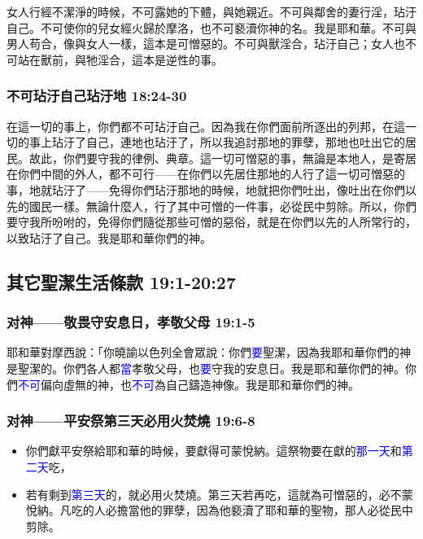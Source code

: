 女人行經不潔淨的時候，不可露她的下體，與她親近。不可與鄰舍的妻行淫，玷汙自己。不可使你的兒女經火歸於摩洛，也不可褻瀆你神的名。我是耶和華。不可與男人苟合，像與女人一樣，這本是可憎惡的。不可與獸淫合，玷汙自己；女人也不可站在獸前，與牠淫合，這本是逆性的事。

\subsubsection{不可玷汙自己玷汙地 18:24-30}
在這一切的事上，你們都不可玷汙自己。因為我在你們面前所逐出的列邦，在這一切的事上玷汙了自己，連地也玷汙了，所以我追討那地的罪孽，那地也吐出它的居民。故此，你們要守我的律例、典章。這一切可憎惡的事，無論是本地人，是寄居在你們中間的外人，都不可行——在你們以先居住那地的人行了這一切可憎惡的事，地就玷汙了——免得你們玷汙那地的時候，地就把你們吐出，像吐出在你們以先的國民一樣。無論什麼人，行了其中可憎的一件事，必從民中剪除。所以，你們要守我所吩咐的，免得你們隨從那些可憎的惡俗，就是在你們以先的人所常行的，以致玷汙了自己。我是耶和華你們的神。

\subsection{其它聖潔生活條款 19:1-20:27}
\subsubsection{对神——敬畏守安息日，孝敬父母 19:1-5}
耶和華對摩西說：「你曉諭以色列全會眾說：你們\textcolor{blue}{要}聖潔，因為我耶和華你們的神是聖潔的。你們各人都\textcolor{blue}{當}孝敬父母，也\textcolor{blue}{要}守我的安息日。我是耶和華你們的神。你們\textcolor{blue}{不可}偏向虛無的神，也\textcolor{blue}{不可}為自己鑄造神像。我是耶和華你們的神。

\subsubsection{对神——平安祭第三天必用火焚燒 19:6-8}
\begin{itemize} 
\itemsep-.35em
\item 你們獻平安祭給耶和華的時候，要獻得可蒙悅納。這祭物要在獻的\textcolor{blue}{那一天}和\textcolor{blue}{第二天}吃，
\item 若有剩到\textcolor{blue}{第三天}的，就必用火焚燒。第三天若再吃，這就為可憎惡的，必不蒙悅納。凡吃的人必擔當他的罪孽，因為他褻瀆了耶和華的聖物，那人必從民中剪除。
\end{itemize}

